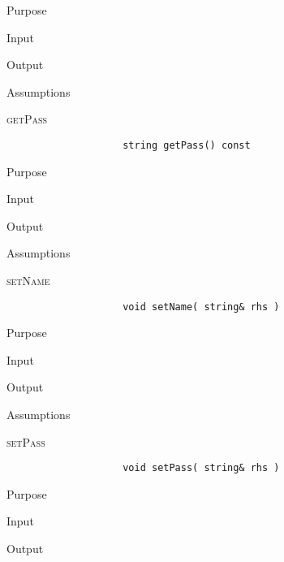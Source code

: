 \documentclass[pdftex, 12pt]{article}
\begin{document}
\begin{description}
\begin{description}
\begin{description}
\begin{description}
					\item{Purpose}

					\item{Input}

					\item{Output}

					\item{Assumptions}

				\end{description}
			\item{\textsc{getPass}}
				\begin{lstlisting}
					string getPass() const
				\end{lstlisting}
				\begin{description}

					\item{Purpose}

					\item{Input}

					\item{Output}

					\item{Assumptions}

				\end{description}
			\item{\textsc{setName}}
				\begin{lstlisting}
					void setName( string& rhs )
				\end{lstlisting}
				\begin{description}

					\item{Purpose}

					\item{Input}

					\item{Output}

					\item{Assumptions}

				\end{description}
			\item{\textsc{setPass}}
				\begin{lstlisting}
					void setPass( string& rhs )
				\end{lstlisting}
				\begin{description}

					\item{Purpose}

					\item{Input}

					\item{Output}


\end{description}
\end{description}
\end{description}
\end{description}
\end{document}
